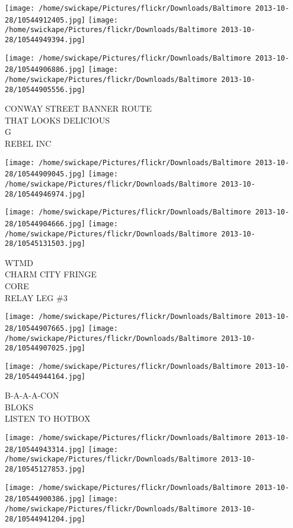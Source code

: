 \documentclass[10pt,letterpaper]{article}
\begin{document}
\texttt{[image: /home/swickape/Pictures/flickr/Downloads/Baltimore 2013-10-28/10544912405.jpg]}
\texttt{[image: /home/swickape/Pictures/flickr/Downloads/Baltimore 2013-10-28/10544949394.jpg]}

\texttt{[image: /home/swickape/Pictures/flickr/Downloads/Baltimore 2013-10-28/10544906886.jpg]}
\texttt{[image: /home/swickape/Pictures/flickr/Downloads/Baltimore 2013-10-28/10544905556.jpg]}

CONWAY STREET BANNER ROUTE\\
THAT LOOKS DELICIOUS\\
G\\
REBEL INC\\
\pagebreak

\texttt{[image: /home/swickape/Pictures/flickr/Downloads/Baltimore 2013-10-28/10544909045.jpg]}
\texttt{[image: /home/swickape/Pictures/flickr/Downloads/Baltimore 2013-10-28/10544946974.jpg]}

\texttt{[image: /home/swickape/Pictures/flickr/Downloads/Baltimore 2013-10-28/10544904666.jpg]}
\texttt{[image: /home/swickape/Pictures/flickr/Downloads/Baltimore 2013-10-28/10545131503.jpg]}

WTMD\\
CHARM CITY FRINGE\\
CORE\\
RELAY LEG \#3\\
\pagebreak

\texttt{[image: /home/swickape/Pictures/flickr/Downloads/Baltimore 2013-10-28/10544907665.jpg]}
\texttt{[image: /home/swickape/Pictures/flickr/Downloads/Baltimore 2013-10-28/10544907025.jpg]}

\vspace{0.25in}
\texttt{[image: /home/swickape/Pictures/flickr/Downloads/Baltimore 2013-10-28/10544944164.jpg]}

B{-}A{-}A{-}A{-}CON\\
BLOKS\\
LISTEN TO HOTBOX\\
\pagebreak

\texttt{[image: /home/swickape/Pictures/flickr/Downloads/Baltimore 2013-10-28/10544943314.jpg]}
\texttt{[image: /home/swickape/Pictures/flickr/Downloads/Baltimore 2013-10-28/10545127853.jpg]}

\texttt{[image: /home/swickape/Pictures/flickr/Downloads/Baltimore 2013-10-28/10544900386.jpg]}
\texttt{[image: /home/swickape/Pictures/flickr/Downloads/Baltimore 2013-10-28/10544941204.jpg]}
\end{document}
